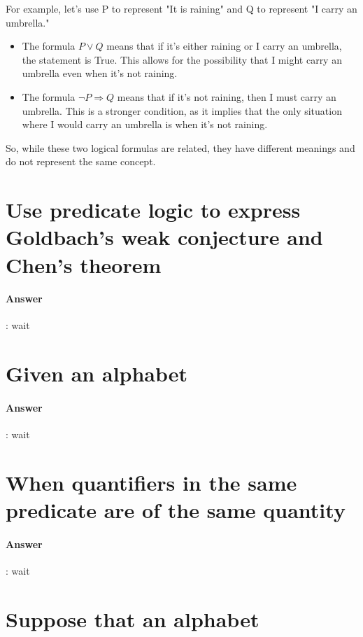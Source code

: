 \documentclass{article}
\begin{document}
For example, let's use P to represent "It is raining" and Q to represent "I carry an umbrella."

\begin{itemize}
  \item The formula $P \lor Q$ means that if it's either raining or I carry an umbrella, the statement is True. This allows for the possibility that I might carry an umbrella even when it's not raining.
  \item The formula $\lnot P \Rightarrow Q$ means that if it's not raining, then I must carry an umbrella. This is a stronger condition, as it implies that the only situation where I would carry an umbrella is when it's not raining.

\end{itemize}

So, while these two logical formulas are related, they have different meanings and do not represent the same concept.


\section{Use predicate logic to express Goldbach's weak conjecture and Chen's theorem}

\paragraph{Answer}:
wait

\section{Given an alphabet}

\paragraph{Answer}:
wait

\section{When quantifiers in the same predicate are of the same quantity}

\paragraph{Answer}:
wait

\section{Suppose that an alphabet}
\end{document}

